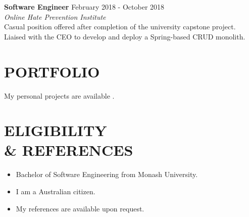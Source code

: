 \documentclass[margin, 11pt]{style}
\begin{document}
\begin{resume}
\begin{itemize}
\end{itemize}


\textbf{Software Engineer} \hfill February 2018 - October 2018 \\
{\sl Online Hate Prevention Institute}
\vspace{15pt}\\
Casual position offered after completion of the university capstone project. Liaised with the CEO to develop and deploy a Spring-based CRUD monolith.

\section{PORTFOLIO}

My personal projects are available \underline{}.

\section{ELIGIBILITY \\ \& REFERENCES}

\begin{itemize}

\item Bachelor of Software Engineering from Monash University.
\item I am a Australian citizen.
\item My references are available upon request.


\end{itemize}

\end{resume}
\end{document}
